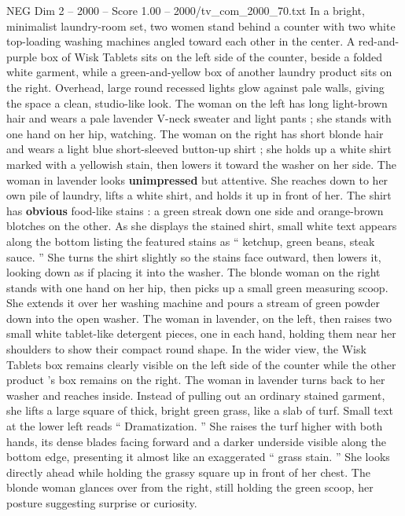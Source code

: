 \begin{textsample}{NEG Dim 2 – 2000 – Score 1.00 – 2000/tv\_com\_2000\_70.txt}  \label{ex:f2_neg_078}
In a bright, minimalist laundry-room set, two women stand behind a counter with two white top-loading washing machines angled toward each other in the center.
A red-and-purple box of Wisk Tablets sits on the left side of the counter, beside a folded white garment, while a green-and-yellow box of another laundry product sits on the right.
Overhead, large round recessed lights glow against pale walls, giving the space a clean, studio-like look.
The woman on the left has long light-brown hair and wears a pale lavender V-neck sweater and light pants ; she stands with one hand on her hip, watching.
The woman on the right has short blonde hair and wears a light blue short-sleeved button-up shirt ; she holds up a white shirt marked with a yellowish stain, then lowers it toward the washer on her side.
The woman in lavender looks \textbf{unimpressed} but attentive.
She reaches down to her own pile of laundry, lifts a white shirt, and holds it up in front of her.
The shirt has \textbf{obvious} food-like stains : a green streak down one side and orange-brown blotches on the other.
As she displays the stained shirt, small white text appears along the bottom listing the featured stains as “ ketchup, green beans, steak sauce. ” She turns the shirt slightly so the stains face outward, then lowers it, looking down as if placing it into the washer.
The blonde woman on the right stands with one hand on her hip, then picks up a small green measuring scoop.
She extends it over her washing machine and pours a stream of green powder down into the open washer.
The woman in lavender, on the left, then raises two small white tablet-like detergent pieces, one in each hand, holding them near her shoulders to show their compact round shape.
In the wider view, the Wisk Tablets box remains clearly visible on the left side of the counter while the other product ’s box remains on the right.
The woman in lavender turns back to her washer and reaches inside.
Instead of pulling out an ordinary stained garment, she lifts a large square of thick, bright green grass, like a slab of turf.
Small text at the lower left reads “ Dramatization. ” She raises the turf higher with both hands, its dense blades facing forward and a darker underside visible along the bottom edge, presenting it almost like an exaggerated “ grass stain. ” She looks directly ahead while holding the grassy square up in front of her chest.
The blonde woman glances over from the right, still holding the green scoop, her posture suggesting surprise or curiosity.

\end{textsample}
